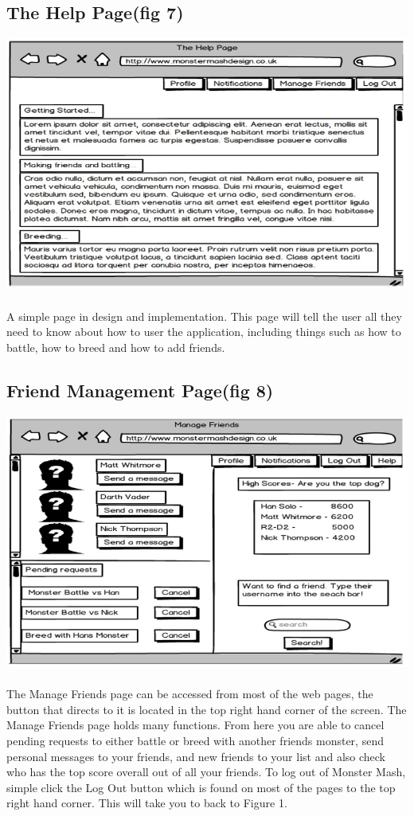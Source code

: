 \documentclass{project}
\begin{document}
\subsection{The Help Page(fig 7)}
\includegraphics[scale=0.5]{help.jpg}
\\
\\
A simple page in design and implementation. This page will tell the user all they
need to know about how to user the application, including things such as how to
battle, how to breed and how to add friends.

\subsection{Friend Management Page(fig 8)}
\includegraphics[scale=0.5]{manageFriends.jpg}
\\
\\
The Manage Friends page can be accessed from most of the web pages, the button
that directs to it is located in the top right hand corner of the screen.
The Manage Friends page holds many functions. From here you are able to cancel
pending requests to either battle or breed with another friends monster, send personal
messages to your friends, and new friends to your list and also check who has
the top score overall out of all your friends.
To log out of Monster Mash, simple click the Log Out button which is found on
most of the pages to the top right hand corner. This will take you to back to Figure
1.
\end{document}
